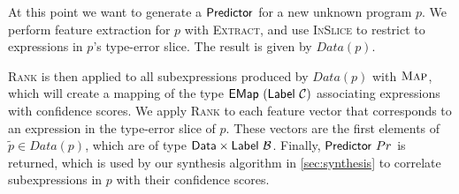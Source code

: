 At this point we want to generate a $\mathsf{Predictor}$ for a new unknown program
$p$. We perform feature extraction for $p$ with \textsc{Extract}, and use
\textsc{InSlice} to restrict to expressions in $p$'s type-error slice.
The result is given by $Data(p)$.

\textsc{Rank} is then applied to all subexpressions produced by $Data(p)$ with
$\textsc{Map}$, which will create a mapping of the type
$\mathsf{EMap}\ (\mathsf{Label}\ \mathcal{C})$ associating expressions with confidence scores. We
apply \textsc{Rank} to each feature vector that corresponds to an expression in
the type-error slice of $p$. These vectors are the first elements of $\tilde{p}
\in Data(p)$, which are of type $\mathsf{Data} \times \mathsf{Label}\ \mathcal{B}$. Finally,
$\mathsf{Predictor}\ Pr$ is returned, which is used by our synthesis algorithm in
\autoref{sec:synthesis} to correlate subexpressions in $p$ with their confidence
scores.
